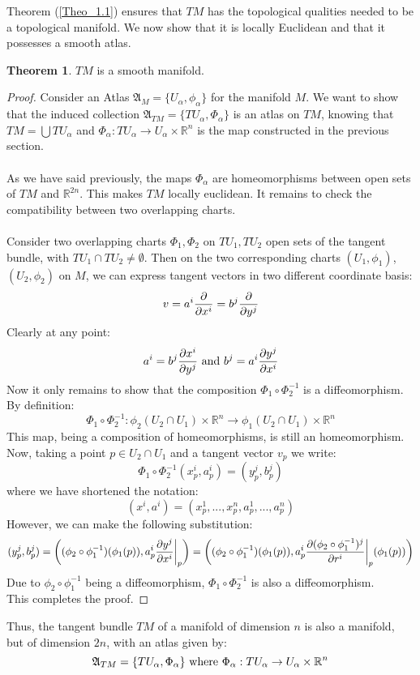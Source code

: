 \documentclass[12pt,a4paper]{report}
\theoremstyle{definition}
\theoremstyle{Theorem}
\newtheorem{Theo}[Def]{Theorem}
\theoremstyle{definition}
\theoremstyle{definition}
\begin{document}
	Theorem (\ref{Theo_1.1}) ensures that $TM$ has the topological qualities needed to be a topological manifold. We now show that it is locally Euclidean and that it possesses a smooth atlas.
	\begin{Theo}
		$TM$ is a smooth manifold.
	\end{Theo}
	\begin{proof}
		Consider an Atlas $\mathfrak{A}_M=\{U_\alpha,\phi_\alpha\}$ for the manifold $M$. We want to show that the induced collection $\mathfrak{A}_{TM}=\{TU_\alpha,\Phi_\alpha\}$ is an atlas on $TM$, knowing that $TM=\bigcup TU_\alpha$ and $\Phi_\alpha:TU_\alpha\rightarrow U_\alpha\times \mathbb{R}^n$ is the map constructed in the previous section.\\
		\\
		As we have said previously, the maps $\Phi_\alpha$ are homeomorphisms between open sets of $TM$ and $\mathbb{R}^{2n}$. This makes $TM$ locally euclidean. It remains to check the compatibility between two overlapping charts.\\
		\\
		Consider two overlapping charts $\Phi_1,\Phi_2$ on $TU_1,TU_2$ open sets of the tangent bundle, with $TU_1\cap TU_2\neq \emptyset$. Then on the two corresponding charts $(U_1,\phi_1)$, $(U_2,\phi_2)$ on $M$, we can express tangent vectors in two different coordinate basis:
		$$v=a^i{\partial\over \partial{x^i}}=b^j{\partial \over \partial y^j}$$
		Clearly at any point:
		$$a^i=b^j{\partial x^i\over\partial y^j} \hbox{ and } b^j=a^i{\partial y^j\over\partial x^i}$$
		Now it only remains to show that the composition $\Phi_1\circ \Phi_2^{-1}$ is a diffeomorphism.\\
		By definition:
		$$\Phi_1\circ \Phi_2^{-1}:\phi_2(U_2\cap U_1)\times \mathbb{R}^n\rightarrow \phi_1(U_2\cap U_1)\times \mathbb{R}^n$$
		This map, being a composition of homeomorphisms, is still an homeomorphism. Now, taking a point $p\in U_2\cap U_1$ and a tangent vector $v_p$ we write:
		$$\Phi_1\circ \Phi_2^{-1}(x^i_p,a^i_p)=(y^j_p,b^j_p)$$
		where we have shortened the notation:
		$$(x^i,a^i)=(x^1_p,...,x^n_p,a^1_p,...,a^n_p)$$
		However, we can make the following substitution:
		$$(y^j_p,b^j_p)=\bigg((\phi_2\circ \phi_1^{-1})(\phi_1(p)),a^i_p{\partial y^j\over\partial x^i}\bigg|_p\bigg)=\bigg((\phi_2\circ \phi_1^{-1})(\phi_1(p)),a^i_p{\partial (\phi_2\circ \phi_1^{-1})^j\over\partial r^i}\bigg|_p(\phi_1(p))\bigg)$$
		Due to $\phi_2\circ \phi_1^{-1}$ being a diffeomorphism, $\Phi_1\circ \Phi_2^{-1}$ is also a diffeomorphism.\\
		This completes the proof.
	\end{proof}
	Thus, the tangent bundle $TM$ of a manifold of dimension $n$ is also a manifold, but of dimension $2n$, with an atlas given by:
	$$\mathfrak{A}_{TM}=\{TU_\alpha,\Phi_\alpha\} \hbox{ where } \Phi_\alpha:TU_\alpha\rightarrow U_\alpha\times \mathbb{R}^n$$
\end{document}
